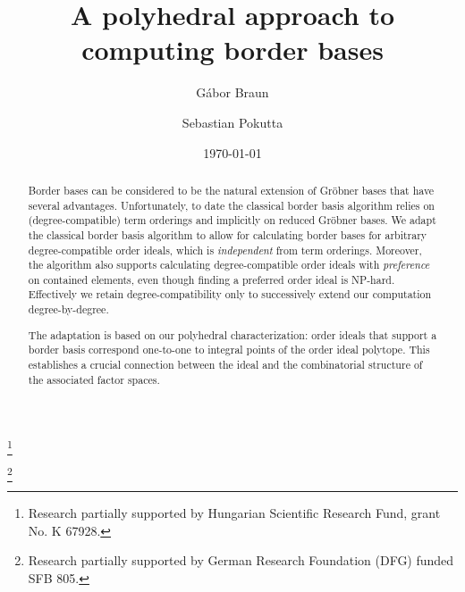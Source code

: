 \documentclass[11pt,oneside,english]{amsart}
\makeatletter
\numberwithin{equation}{section}
\numberwithin{figure}{section}
\theoremstyle{plain}
\theoremstyle{definition}
\theoremstyle{definition}
\theoremstyle{remark}
\theoremstyle{plain}
\theoremstyle{plain}
\theoremstyle{plain}
\theoremstyle{problem@}
\makeatother
\begin{document}
\title{A polyhedral approach to computing border bases}

\author{Gábor Braun}
\address{Alfréd Rényi Institute of Mathematics\\
  Hungarian Academy of Sciences\\
  Reáltanoda u 13\\
  1053\\
  Hungary}
\thanks{Research partially supported by Hungarian Scientific Research Fund,
  grant No. K 67928.}

\author{Sebastian Pokutta}
\thanks{Research partially supported by German Research Foundation
  (DFG) funded SFB 805.}

\address{Fachbereich Mathematik \\ Technische Universität Darmstadt \\ Germany}



\date{\today}

\begin{abstract}
  Border bases can be considered to be the natural extension of Gröbner bases
  that have several advantages. Unfortunately, to date the classical border
  basis algorithm relies on (degree-compatible) term orderings and implicitly
  on reduced Gröbner bases.
  We adapt the classical border basis
  algorithm to allow for calculating border bases for arbitrary
  degree-compatible order ideals,
  which is \emph{independent} from term orderings.
  Moreover,
  the algorithm also supports calculating degree-compatible order ideals
  with \emph{preference} on contained elements, even though finding a
  preferred order ideal is NP-hard.
  Effectively we retain degree-compatibility only to
  successively extend our computation degree-by-degree.
  
  The adaptation is based on our polyhedral characterization:
  order ideals that support a border basis correspond one-to-one to
  integral points of the order ideal polytope.
  This establishes a crucial connection between the ideal and the combinatorial structure of the associated factor spaces.
\end{abstract}
\maketitle
\end{document}
